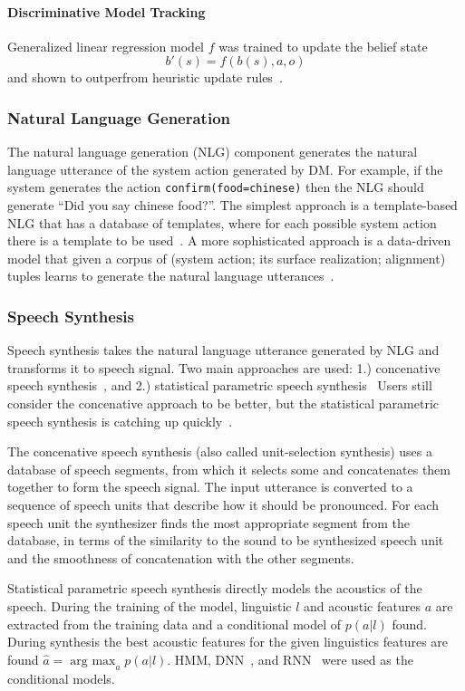 \documentclass[runningheads,a4paper]{llncs}
\begin{document}
\paragraph*{Discriminative Model Tracking}
Generalized linear regression model $f$ was trained to update the belief state
$$b'(s)=f(b(s), a, o)$$
and shown to outperfrom heuristic update rules~\cite{bohus2006k}.

\subsubsection{Natural Language Generation}
The natural language generation (NLG) component generates the natural language utterance of the system action generated by DM. For example, if the system generates the action \texttt{confirm(food=chinese)} then the NLG should generate ``Did you say chinese food?''. The simplest approach is a template-based NLG that has a database of templates, where for each possible system action there is a template to be used~\cite{duvsek2014alex}. A more sophisticated approach is a data-driven model that given a corpus of (system action; its surface realization; alignment) tuples learns to generate the natural language utterances~\cite{mairesse2010phrase}.

\subsubsection{Speech Synthesis}
Speech synthesis takes the natural language utterance generated by NLG and transforms it to speech signal. Two main approaches are used: 1.) concenative speech synthesis~\cite{campbell1997prosody,masuko1996speech}, and 2.) statistical parametric speech synthesis~\cite{zen2009statistical} Users still consider the concenative approach to be better, but the statistical parametric speech synthesis is catching up quickly~\cite{zen2009statistical}.

The concenative speech synthesis (also called unit-selection synthesis) uses a database of speech segments, from which it selects some and concatenates them together to form the speech signal. The input utterance is converted to a sequence of speech units that describe how it should be pronounced. For each speech unit the synthesizer finds the most appropriate segment from the database, in terms of the similarity to the sound to be synthesized speech unit and the smoothness of concatenation with the other segments.

Statistical parametric speech synthesis directly models the acoustics of the speech. During the training of the model, linguistic $l$ and acoustic features $a$ are extracted from the training data and a conditional model of $p(a|l)$ found. During synthesis the best acoustic features for the given linguistics features are found $\hat{a}=\operatorname{arg~max}_a p(a|l)$. HMM\cite{yoshimuray1999simultaneous}, DNN~\cite{ze2013statistical}, and RNN~\cite{zen2015unidirectional} were used as the conditional models.
\end{document}
